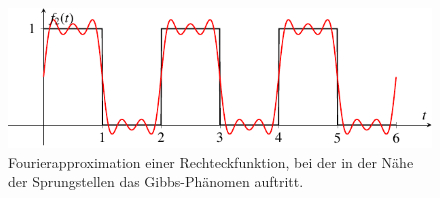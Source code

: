 %
%
%
\begin{figure}
	\centering
	\includegraphics{papers/fourier/images/fourier_Rechteck.pdf}
	\caption{Fourierapproximation einer Rechteckfunktion, bei der in der Nähe der Sprungstellen das Gibbs-Phänomen auftritt.%
	\label{fourier:fig:fourierrechteck}}
\end{figure}